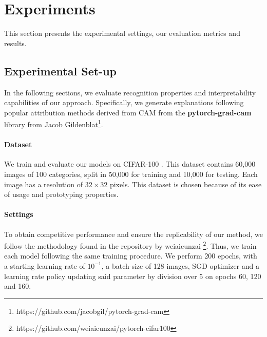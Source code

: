 \section{Experiments}
\label{sec:grad_expes}
This section presents the experimental settings, our evaluation metrics and results.

\subsection{Experimental Set-up}
In the following sections, we evaluate recognition properties and interpretability capabilities of 
our approach. Specifically, we generate explanations following popular attribution methods derived 
from CAM \autocite{zhou2016learning} from the \textbf{pytorch-grad-cam} library from Jacob 
Gildenblat\footnote{https://github.com/jacobgil/pytorch-grad-cam}.

\paragraph{Dataset}
We train and evaluate our models on CIFAR-100 \autocite{krizhevsky2009learning}. This dataset 
contains 60,000 images of 100 categories, split in 50,000 for training and 10,000 for testing. Each 
image has a resolution of $32\times32$ pixels. This dataset is chosen because of its ease of usage 
and prototyping properties. 

\paragraph{Settings}
To obtain competitive performance and ensure the replicability of our method, we follow the 
methodology found in the repository by weiaicunzai 
\footnote{https://github.com/weiaicunzai/pytorch-cifar100}. Thus, we train each model following the 
same training procedure. We perform 200 epochs, with a starting learning rate of $10^{-1}$, a 
batch-size of 128 images, SGD optimizer and a learning rate policy updating said parameter by 
division over 5 on epochs 60, 120 and 160.  
